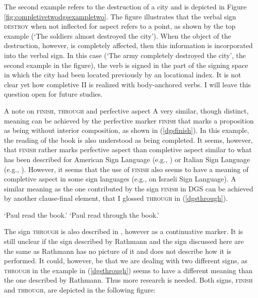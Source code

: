 The second example refers to the destruction of a city and is depicted in Figure \ref{fig:completivetwodgsexampletwo}. The figure illustrates that the verbal sign \textsc{destroy} when not inflected for aspect refers to a point, as shown by the top example (`The soldiers almost destroyed the city'). When the object of the destruction, however, is completely affected, then this information is incorporated into the verbal sign. In this case (`The army completely destroyed the city', the second example in the figure), the verb is signed in the part of the signing space in which the city had been located previously by an locational index. It is not clear yet how completive II is realized with body-anchored verbs. I will leave this question open for future studies.



\begin{digression}{{A note on \textsc{finish}, \textsc{through} and perfective aspect}}{}
\noindent \label{exkursfertigdurch}A very similar, though distinct, meaning can be achieved by the perfective marker \textsc{finish} that marks a proposition as being without interior composition, as shown in (\ref{dgsfinish}). In this example, the reading of the book is also understood as being completed. It seems, however, that \textsc{finish} rather marks perfective aspect than completive aspect similar to what has been described for American Sign Language (e.g., \citealt{aarons1992clausal}) or Italian Sign Language (e.g., \citealt{zucchi2003}). However, it seems that the use of \textsc{finish} also seems to have a meaning of completive aspect in some sign languages (e.g., \citealt{meir1999aperfect} on Israeli Sign Language). A similar meaning as the one contributed by the sign \textsc{finish} in DGS can be achieved by another clause-final element, that I glossed \textsc{through} in (\ref{dgsthrough}).


\begin{exe}
\ex\label{ex:perfectivea}\begin{xlist}
\glt `Paul read the book.' \label{dgsfinish}
\glt `Paul read through the book.' \label{dgsthrough}
\end{xlist}
\end{exe}

\noindent The sign \textsc{through} is also described in \citet[259]{rathmann2005event}, however as a continuative marker. It is still unclear if the sign described by Rathmann and the sign discussed here are the same as Rathmann has no picture of it and does not describe how it is performed. It could, however, be that we are dealing with two different signs, as \textsc{through} in the example in (\ref{dgsthrough}) seems to have a different meaning than the one described by Rathmann. Thus more research is needed. Both signs, \textsc{finish} and \textsc{through}, are depicted in the following figure: \\


\end{digression}
